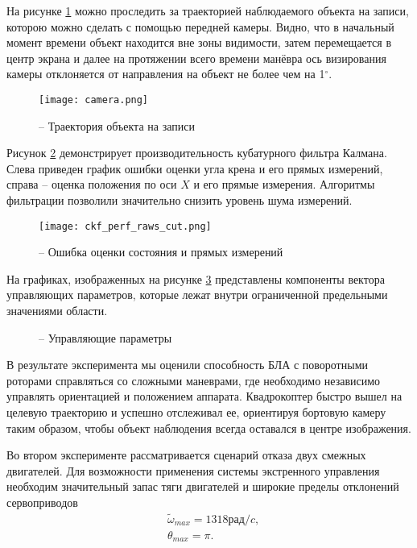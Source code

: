 На рисунке \ref{fig:mau_cam} можно проследить за траекторией наблюдаемого объекта на записи, которою можно сделать с помощью передней камеры.
Видно, что в начальный момент времени объект находится вне зоны видимости, затем перемещается в центр экрана и далее на протяжении всего времени манёвра ось визирования камеры отклоняется от направления на объект не более чем на 1$^\circ$.
\begin{figure}[H]
	\centering
	\texttt{[image: camera.png]}
	\caption{ -- Траектория объекта на записи}
	\label{fig:mau_cam}
\end{figure}
Рисунок \ref{fig:mau_est} демонстрирует производительность кубатурного фильтра Калмана. Слева приведен график ошибки оценки угла крена и его прямых измерений, справа – оценка положения по оси $X$ и его прямые измерения.
Алгоритмы фильтрации позволили значительно снизить уровень шума измерений.
\begin{figure}[H]
	\centering
	\texttt{[image: ckf\_perf\_raws\_cut.png]}
	\caption{ -- Ошибка оценки состояния и прямых измерений}
	\label{fig:mau_est}
\end{figure}

На графиках, изображенных на рисунке \ref{fig:mau_ctrl_out} представлены компоненты вектора управляющих параметров, которые лежат внутри ограниченной предельными значениями области.

\begin{figure}[H]
	\centering
	
	\caption{ -- Управляющие параметры}
	\label{fig:mau_ctrl_out}
	
\end{figure}


В результате эксперимента мы оценили способность БЛА с поворотными роторами справляться со сложными маневрами, где необходимо независимо управлять ориентацией и положением аппарата. Квадрокоптер быстро вышел на целевую траекторию и успешно отслеживал ее, ориентируя бортовую камеру таким образом, чтобы объект наблюдения всегда оставался в центре изображения.

Во втором эксперименте рассматривается сценарий отказа двух смежных двигателей. Для возможности применения системы экстренного управления необходим значительный запас тяги двигателей и широкие пределы отклонений сервоприводов
\begin{equation}
\begin{aligned}
&\tilde{\omega}_{max} = 1318 рад/c,
\\
&\theta_{max} = \pi.
\end{aligned}
\end{equation}

